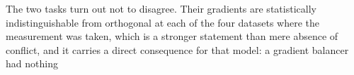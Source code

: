 The two tasks turn out not to disagree. Their gradients are statistically indistinguishable from
orthogonal at each of the four datasets where the measurement was taken, which is a stronger statement than mere absence of
conflict, and it carries a direct consequence for that model: a gradient balancer had nothing
